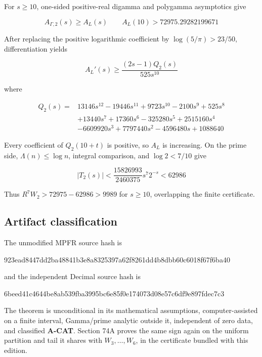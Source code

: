 \documentclass[
  11pt,
]{book}
\newenvironment{Shaded}{}{}
\newcommand{\NormalTok}[1]{#1}
\begin{document}
For \(s\ge10\), one-sided positive-real digamma and polygamma
asymptotics give

\[
A_{\Gamma,2}(s)\ge A_L(s)
\qquad
A_L(10)>72975.29282199671
\]

After replacing the positive logarithmic coefficient by
\(\log(5/\pi)>23/50\), differentiation yields

\[
A_L'(s)\ge\frac{(2s-1)Q_2(s)}{525s^{10}}
\]

where

\[
\begin{aligned}
Q_2(s)={}&13146s^{12}-19446s^{11}+9723s^{10}-2100s^9+525s^8\\
&+13440s^7+17360s^6-325280s^5+2515160s^4\\
&-6609920s^3+7797440s^2-4596480s+1088640
\end{aligned}
\]

Every coefficient of \(Q_2(10+t)\) is positive, so \(A_L\) is
increasing. On the prime side, \(\Lambda(n)\le\log n\), integral
comparison, and \(\log2<7/10\) give

\[
|T_2(s)|
<\frac{15826993}{2460375}s^7 2^{-s}<62986
\]

Thus \(R^7W_2>72975-62986>9989\) for \(s\ge10\), overlapping the finite
certificate.

\subsection{Artifact classification}\label{artifact-classification}

The unmodified MPFR source hash is

\begin{Shaded}
\begin{Highlighting}[]
\NormalTok{923ead8447dd2ba48841b3e8a8325397a62f8261dd4b8dbb60c6018f67f6ba40}
\end{Highlighting}
\end{Shaded}

and the independent Decimal source hash is

\begin{Shaded}
\begin{Highlighting}[]
\NormalTok{6beed41c4644be8ab539fba3995bc6e85f0e174073d08e57c6df9e897fdec7c3}
\end{Highlighting}
\end{Shaded}

The theorem is unconditional in its mathematical assumptions,
computer-assisted on a finite interval, Gamma/prime analytic outside it,
independent of zero data, and classified \textbf{A-CAT}. Section 74A
proves the same sign again on the uniform partition and tail it shares
with \(W_3,\ldots,W_6\), in the certificate bundled with this edition.
\end{document}
